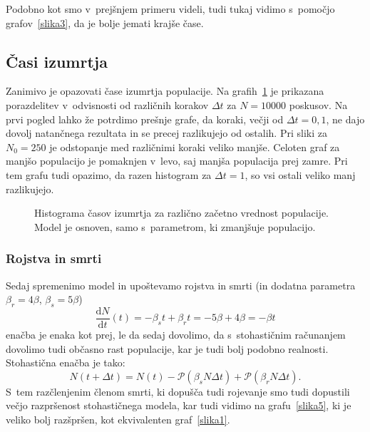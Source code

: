 \documentclass[a4paper,pdftex,11pt]{article}
\numberwithin{figure}{section} %
\begin{document}
Podobno kot smo v~prejšnjem primeru videli, tudi tukaj vidimo s~pomočjo 
grafov~\ref{slika3}, da je bolje jemati krajše čase. 
\pagebreak

\subsection{Časi izumrtja}
Zanimivo je opazovati čase izumrtja populacije. Na grafih~\ref{slika4} je prikazana
porazdelitev v~odvisnosti od različnih korakov $\Delta t$ za $N=10000$ poskusov. Na prvi 
pogled lahko že potrdimo prešnje grafe, da koraki, večji od $\Delta t = 0,1$, ne dajo 
dovolj natančnega rezultata in se precej razlikujejo od ostalih. Pri sliki za $N_0=250$ je 
odstopanje med različnimi koraki veliko manjše. Celoten graf za manjšo populacijo je 
pomaknjen v~levo, saj manjša populacija prej zamre. Pri tem grafu tudi opazimo, da razen
histogram za $\Delta t =1$, so vsi ostali veliko manj razlikujejo.

\begin{figure}    
    \begin{minipage}{\textwidth} 
	\centering 
	\resizebox{0.75\textwidth}{!}{} 
    \end{minipage}
    \begin{minipage}{\textwidth} 
	\centering
	\resizebox{0.75\textwidth}{!}{} 
    \end{minipage}
    \caption{Histograma časov izumrtja za različno začetno vrednost populacije. Model
    je osnoven, samo s~parametrom, ki zmanjšuje populacijo.}
    \label{slika4}
\end{figure}

\subsubsection*{Rojstva in smrti}
Sedaj spremenimo model in upoštevamo rojstva in smrti (in dodatna parametra $\beta_r = 
4\beta$, $\beta_s = 5\beta$)
\begin{equation}
    \frac{\mathrm{d} N}{\mathrm{d} t} (t) = - \beta_s t + \beta_r t = -5\beta  + 4 \beta
    = -\beta t
\end{equation}
enačba je enaka kot prej, le da sedaj dovolimo, da s~stohastičnim računanjem dovolimo
tudi občasno rast populacije, kar je tudi bolj podobno realnosti.
Stohastična enačba je tako:
\begin{equation}
    N (t + \Delta t) = N(t) - \mathcal{P}(\beta_s N \Delta t) + 
    \mathcal{P}(\beta_r N \Delta t).
\end{equation}
S~tem razčlenjenim členom smrti, ki dopušča tudi rojevanje smo tudi dopustili večjo
razpršenost stohastičnega modela, kar tudi vidimo na grafu~\ref{slika5}, ki je veliko
bolj razšpršen, kot ekvivalenten graf~\ref{slika1}.
\end{document}
